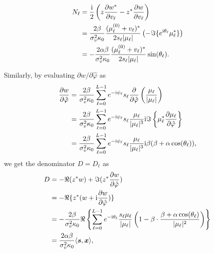 \documentclass[journal,twocolumn]{IEEEtran}
\theoremstyle{nonumberplain}
\def \ri {{\rm i}}
\begin{document}
{\begin{equation}
        \begin{aligned}
            N_\ell &= \frac{\ri}{2} \left( z\frac{\partial w^*}{\partial v_\ell} -z^* \frac{\partial w}{\partial v_\ell} \right) \\
            &= \frac{2\beta}{\sigma_v^2 \kappa_0} \frac{(\mu_\ell^{(0)} + v_\ell)^*}{2s_\ell |\mu_\ell|} \left(-\Im\{e^{\ri \theta_\ell} \mu_\ell^* \}\right) \\
            &= -\frac{2\alpha\beta}{\sigma_v^2 \kappa_0} \frac{(\mu_\ell^{(0)} + v_\ell)^*}{2s_\ell |\mu_\ell|} \sin(\theta_\ell). 
        \end{aligned}
    \end{equation}
    
    Similarly, by evaluating $\partial w/\partial \hat{\varphi}$ as 
    \begin{equation}
        \begin{aligned}
        \frac{\partial w}{\partial \hat{\varphi}} &= \frac{2\beta}{\sigma_v^2 \kappa_0} \sum_{\ell=0}^{L-1} e^{-\ri \psi_\ell} s_\ell \frac{\partial}{\partial \hat{\varphi}}\left(\frac{\mu_\ell}{|\mu_\ell|}\right) \\
        &= \frac{2\beta}{\sigma_v^2 \kappa_0} \sum_{\ell=0}^{L-1} e^{-\ri \psi_\ell} s_\ell  \frac{\mu_\ell}{|\mu_\ell|^3} {\ri} \Im \left\{\mu_\ell^* \frac{\partial \mu_\ell}{\partial \hat{\varphi}}  \right\} \\
        &=  \frac{2\beta}{\sigma_v^2 \kappa_0} \sum_{\ell=0}^{L-1} e^{-\ri \psi_\ell} s_\ell  \frac{\mu_\ell}{|\mu_\ell|^3} {\ri} \beta(\beta + \alpha\cos(\theta_\ell)), 
        \end{aligned}
    \end{equation}
    we get the denominator $D=D_\ell$ as 
    \begin{equation}
        \begin{aligned}
        D &= -\Re(z^*w) +\Im(z^* \frac{\partial w}{\partial \hat{\varphi}}) \\
        &= -\Re\{z^*(w+\ri \frac{\partial w}{\partial \hat{\varphi}})\} \\
        &= -\frac{2\beta}{\sigma_v^2 \kappa_0} \Re\left\{ \sum_{\ell=0}^{L-1}e^{-\ri \theta_\ell}  \frac{s_\ell\mu_\ell}{|\mu_\ell|}\left( 1-\beta\cdot \frac{\beta+\alpha\cos(\theta_\ell)}{|\mu_\ell|^2} \right) \right\} \\
        &= \frac{2\alpha\beta}{\sigma_v^2 \kappa_0} \langle {\bm s}, {\bm x} \rangle,
        \end{aligned}
    \end{equation}
}
\end{document}
